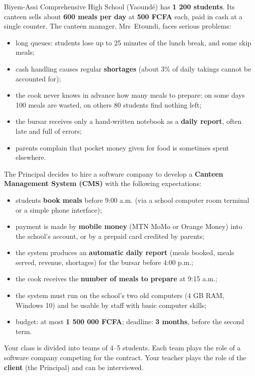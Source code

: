 \documentclass[11pt]{article}
\begin{document}
\begin{experience}
Biyem-Assi Comprehensive High School (Yaoundé) has \textbf{1 200 students}. Its canteen sells about \textbf{600 meals per day} at \textbf{500 FCFA} each, paid in cash at a single counter. The canteen manager, Mrs~Etoundi, faces serious problems:

\begin{itemize}
\item long queues: students lose up to 25 minutes of the lunch break, and some skip meals;
\item cash handling causes regular \textbf{shortages} (about 3\% of daily takings cannot be accounted for);
\item the cook never knows in advance how many meals to prepare: on some days 100 meals are wasted, on others 80 students find nothing left;
\item the bursar receives only a hand-written notebook as a \textbf{daily report}, often late and full of errors;
\item parents complain that pocket money given for food is sometimes spent elsewhere.
\end{itemize}

The Principal decides to hire a software company to develop a \textbf{Canteen Management System (CMS)} with the following expectations:

\begin{itemize}
\item students \textbf{book meals} before 9:00 a.m. (via a school computer room terminal or a simple phone interface);
\item payment is made by \textbf{mobile money} (MTN MoMo or Orange Money) into the school's account, or by a prepaid card credited by parents;
\item the system produces an \textbf{automatic daily report} (meals booked, meals served, revenue, shortages) for the bursar before 4:00 p.m.;
\item the cook receives the \textbf{number of meals to prepare} at 9:15 a.m.;
\item the system must run on the school's two old computers (4 GB RAM, Windows 10) and be usable by staff with basic computer skills;
\item budget: at most \textbf{1 500 000 FCFA}; deadline: \textbf{3 months}, before the second term.
\end{itemize}

Your class is divided into teams of 4--5 students. Each team plays the role of a software company competing for the contract. Your teacher plays the role of the \textbf{client} (the Principal) and can be interviewed.
\end{experience}
\end{document}
